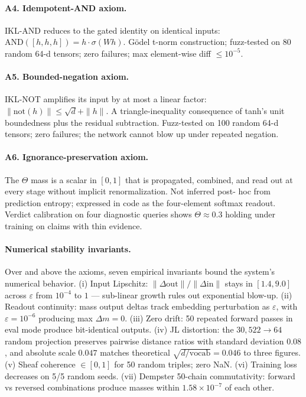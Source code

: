 \documentclass[11pt,a4paper]{article}
\begin{document}
\paragraph{A4. Idempotent-AND axiom.} IKL-AND reduces to the
gated identity on identical inputs:
$\text{AND}([h, h, h]) = h \cdot \sigma(W h)$. Gödel t-norm
construction; fuzz-tested on 80 random 64-d tensors; zero failures;
max element-wise diff $\leq 10^{-5}$.

\paragraph{A5. Bounded-negation axiom.} IKL-NOT amplifies its
input by at most a linear factor:
$\|\text{not}(h)\| \leq \sqrt{d} + \|h\|$. A triangle-inequality
consequence of tanh's unit boundedness plus the residual
subtraction. Fuzz-tested on 100 random 64-d tensors; zero failures;
the network cannot blow up under repeated negation.

\paragraph{A6. Ignorance-preservation axiom.} The $\Theta$ mass is
a scalar in $[0, 1]$ that is propagated, combined, and read out at
every stage without implicit renormalization. Not inferred post-
hoc from prediction entropy; expressed in code as the four-element
softmax readout. Verdict calibration on four diagnostic queries
shows $\Theta \approx 0.3$ holding under training on claims with
thin evidence.

\paragraph{Numerical stability invariants.} Over and above the
axioms, seven empirical invariants bound the system's numerical
behavior. (i) Input Lipschitz: $\|\Delta\text{out}\|/\|\Delta\text{in}\|$
stays in $[1.4, 9.0]$ across $\varepsilon$ from $10^{-4}$ to $1$
--- sub-linear growth rules out exponential blow-up. (ii) Readout
continuity: mass output deltas track embedding perturbation as
$\varepsilon$, with $\varepsilon = 10^{-6}$ producing max
$\Delta m = 0$. (iii) Zero drift: 50 repeated forward passes in
eval mode produce bit-identical outputs. (iv) JL distortion: the
$30{,}522 \to 64$ random projection preserves pairwise distance
ratios with standard deviation $0.08$, and absolute scale $0.047$
matches theoretical $\sqrt{d/\text{vocab}} = 0.046$ to three
figures. (v) Sheaf coherence $\in [0, 1]$ for 50 random triples;
zero NaN. (vi) Training loss decreases on 5/5 random seeds.
(vii) Dempster 50-chain commutativity: forward vs reversed
combinations produce masses within $1.58 \times 10^{-7}$ of each
other.
\end{document}
